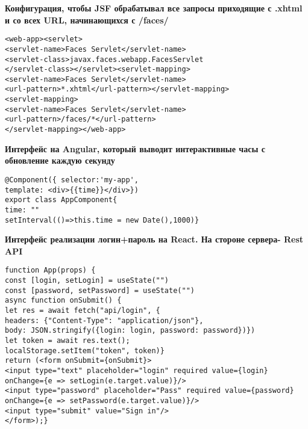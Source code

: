 \documentclass{article}
\begin{document}
\begin{minipage}[t]{0.3\textwidth}
    \textbf{Конфигурация, чтобы JSF обрабатывал все запросы приходящие с .xhtml и со всех URL, начинающихся с /faces/}
    \begin{lstlisting}[frame=single, basicstyle=\tiny\ttfamily, breaklines=true, breakatwhitespace=true, postbreak=\mbox{\textcolor{red}{$\hookrightarrow$}\space}]
<web-app><servlet>
<servlet-name>Faces Servlet</servlet-name>
<servlet-class>javax.faces.webapp.FacesServlet
</servlet-class></servlet><servlet-mapping>
<servlet-name>Faces Servlet</servlet-name>
<url-pattern>*.xhtml</url-pattern></servlet-mapping>
<servlet-mapping>
<servlet-name>Faces Servlet</servlet-name> 
<url-pattern>/faces/*</url-pattern>
</servlet-mapping></web-app>
    \end{lstlisting}
\end{minipage}%
\hfill
\begin{minipage}[t]{0.3\textwidth}
    \textbf{Интерфейс на Angular, который выводит интерактивные часы с обновление каждую секунду}
    \begin{lstlisting}[frame=single, basicstyle=\tiny\ttfamily, breaklines=true, breakatwhitespace=true, postbreak=\mbox{\textcolor{red}{$\hookrightarrow$}\space}]
@Component({ selector:'my-app', 
template: <div>{{time}}</div>})
export class AppComponent{
time: ""
setInterval(()=>this.time = new Date(),1000)}
    \end{lstlisting}
\end{minipage}%
\hfill
\begin{minipage}[t]{0.3\textwidth}
    \textbf{Интерфейс реализации логин+пароль на React. На стороне сервера- Rest API}
    \begin{lstlisting}[frame=single, basicstyle=\tiny\ttfamily, breaklines=true, breakatwhitespace=true, postbreak=\mbox{\textcolor{red}{$\hookrightarrow$}\space}]
function App(props) {
const [login, setLogin] = useState("")
const [password, setPassword] = useState("")
async function onSubmit() {
let res = await fetch("api/login", {
headers: {"Content-Type": "application/json"},
body: JSON.stringify({login: login, password: password})})
let token = await res.text();
localStorage.setItem("token", token)}
return (<form onSubmit={onSubmit}>
<input type="text" placeholder="login" required value={login}
onChange={e => setLogin(e.target.value)}/>
<input type="password" placeholder="Pass" required value={password}
onChange={e => setPassword(e.target.value)}/>
<input type="submit" value="Sign in"/>
</form>);}
    \end{lstlisting}
\end{minipage}%
\end{document}
